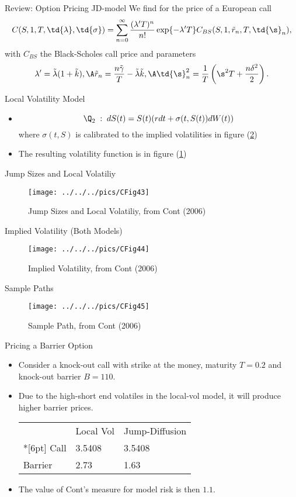 {Review: Option Pricing JD-model}
We find for the price of a European call
$$
C(S, 1, T, \td{\lambda}, \td{\sigma}) = \sum_{n=0}^\infty
\frac{(\lambda' T)^n }{n!} \exp\{-\lambda' T\}
C_{BS}(S,1,\tilde{r}_n,T,\td{\s}_n),
$$
with $C_{BS}$ the Black-Scholes call price and parameters
$$
\lambda'=\tilde{\lambda}(1+\tilde{k}),\A \tilde{r}_n=
\frac{n\tilde{\gamma}}{T}-\tilde{\lambda}\tilde{k},\A \td{\s}_n^2
= \frac{1}{T}\left(\s^2T +\frac{n\delta^2}{2}\right).
$$

{Local Volatility Model}
\begin{itemize}
\item<1->
\begin{equation}\label{Local-Volatility Model}
\Q_2\;:\; dS(t) = S(t)(r dt + \sigma(t, S(t)) dW(t))
\end{equation}
where $ \sigma(t, S)$ is calibrated to the implied volatilities in figure (\ref{CFig44})

\item<2->The resulting volatility function is in figure (\ref{CFig43})
\end{itemize}

{Jump Sizes and Local Volatiliy}
\begin{figure}[htp]
\centering
\texttt{[image: ../../../pics/CFig43]}
\caption{Jump Sizes and Local Volatiliy, from Cont (2006)}\label{CFig43}
\end{figure}

{Implied Volatility (Both Models)}
\begin{figure}[htp]
\centering
\texttt{[image: ../../../pics/CFig44]}
\caption{Implied Volatility, from Cont (2006)}
\label{CFig44}
\end{figure}

{Sample Paths}
\begin{figure}[htp]
\centering
\texttt{[image: ../../../pics/CFig45]}
\caption{Sample Path, from Cont (2006)}\label{CFig45}
\end{figure}

{Pricing a Barrier Option}
\begin{itemize}
\item<1->
Consider a knock-out call with strike at the money, maturity $T=0.2 $ and knock-out barrier $B=110$.
\item<2-> Due to the high-short end volatiles in the local-vol model, it will produce higher barrier prices.

\begin{table}
\begin{tabular}{lll}
& Local Vol & Jump-Diffusion \\*[6pt]\hline
Call & 3.5408 & 3.5408 \\
Barrier & 2.73 & 1.63 \\\hline
\end{tabular}
\end{table}
\item<3->
The value of Cont's measure for model risk is then $1.1$.
\end{itemize}

